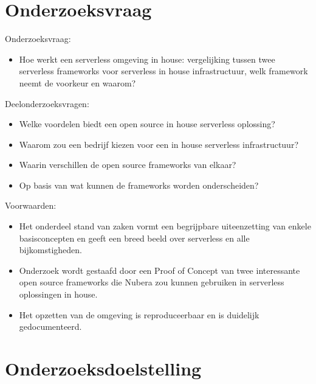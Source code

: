 \section{Onderzoeksvraag}
\label{sec:onderzoeksvraag}


Onderzoeksvraag: 
\begin{itemize}
    \item Hoe werkt een serverless omgeving in house: vergelijking tussen twee serverless frameworks  voor serverless in house infrastructuur, welk framework neemt de voorkeur en waarom?
\end{itemize}

Deelonderzoeksvragen: 
\begin{itemize}
    \item Welke voordelen biedt een open source in house serverless oplossing?
    \item Waarom zou een bedrijf kiezen voor een in house serverless infrastructuur?
    \item Waarin verschillen de open source frameworks van elkaar?
    \item Op basis van wat kunnen de frameworks worden onderscheiden? 
\end{itemize}

Voorwaarden: 
\begin{itemize}
    \item Het onderdeel stand van zaken vormt een begrijpbare uiteenzetting van enkele basisconcepten en geeft een breed beeld over serverless en alle bijkomstigheden.
    \item Onderzoek wordt gestaafd door een Proof of Concept van  twee interessante open source frameworks die  Nubera zou kunnen gebruiken in serverless oplossingen in house.
    \item Het opzetten van de omgeving is reproduceerbaar en is duidelijk gedocumenteerd.
\end{itemize}



\section{Onderzoeksdoelstelling}
\label{sec:onderzoeksdoelstelling}

